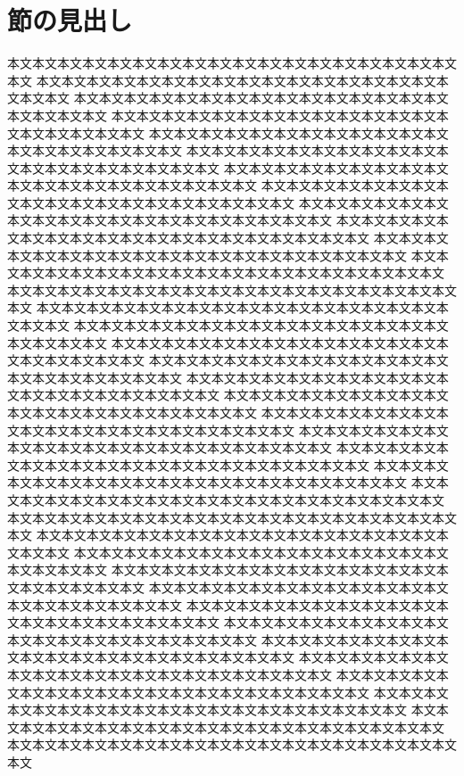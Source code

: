 \documentclass{mta}
\begin{document}
\section{節の見出し}
本文本文本文本文本文本文本文本文本文本文本文本文本文本文本文本文本文本文本文
本文本文本文本文本文本文本文本文本文本文本文本文本文本文本文本文本文本文本文
本文本文本文本文本文本文本文本文本文本文本文本文本文本文本文本文本文本文本文
本文本文本文本文本文本文本文本文本文本文本文本文本文本文本文本文本文本文本文
本文本文本文本文本文本文本文本文本文本文本文本文本文本文本文本文本文本文本文
本文本文本文本文本文本文本文本文本文本文本文本文本文本文本文本文本文本文本文
本文本文本文本文本文本文本文本文本文本文本文本文本文本文本文本文本文本文本文
本文本文本文本文本文本文本文本文本文本文本文本文本文本文本文本文本文本文本文
本文本文本文本文本文本文本文本文本文本文本文本文本文本文本文本文本文本文本文
本文本文本文本文本文本文本文本文本文本文本文本文本文本文本文本文本文本文本文
本文本文本文本文本文本文本文本文本文本文本文本文本文本文本文本文本文本文本文
本文本文本文本文本文本文本文本文本文本文本文本文本文本文本文本文本文本文本文
本文本文本文本文本文本文本文本文本文本文本文本文本文本文本文本文本文本文本文
本文本文本文本文本文本文本文本文本文本文本文本文本文本文本文本文本文本文本文
本文本文本文本文本文本文本文本文本文本文本文本文本文本文本文本文本文本文本文
本文本文本文本文本文本文本文本文本文本文本文本文本文本文本文本文本文本文本文
本文本文本文本文本文本文本文本文本文本文本文本文本文本文本文本文本文本文本文
本文本文本文本文本文本文本文本文本文本文本文本文本文本文本文本文本文本文本文
本文本文本文本文本文本文本文本文本文本文本文本文本文本文本文本文本文本文本文
本文本文本文本文本文本文本文本文本文本文本文本文本文本文本文本文本文本文本文
本文本文本文本文本文本文本文本文本文本文本文本文本文本文本文本文本文本文本文
本文本文本文本文本文本文本文本文本文本文本文本文本文本文本文本文本文本文本文
本文本文本文本文本文本文本文本文本文本文本文本文本文本文本文本文本文本文本文
本文本文本文本文本文本文本文本文本文本文本文本文本文本文本文本文本文本文本文
本文本文本文本文本文本文本文本文本文本文本文本文本文本文本文本文本文本文本文
本文本文本文本文本文本文本文本文本文本文本文本文本文本文本文本文本文本文本文
本文本文本文本文本文本文本文本文本文本文本文本文本文本文本文本文本文本文本文
本文本文本文本文本文本文本文本文本文本文本文本文本文本文本文本文本文本文本文
本文本文本文本文本文本文本文本文本文本文本文本文本文本文本文本文本文本文本文
本文本文本文本文本文本文本文本文本文本文本文本文本文本文本文本文本文本文本文
本文本文本文本文本文本文本文本文本文本文本文本文本文本文本文本文本文本文本文
本文本文本文本文本文本文本文本文本文本文本文本文本文本文本文本文本文本文本文
本文本文本文本文本文本文本文本文本文本文本文本文本文本文本文本文本文本文本文
本文本文本文本文本文本文本文本文本文本文本文本文本文本文本文本文本文本文本文
本文本文本文本文本文本文本文本文本文本文本文本文本文本文本文本文本文本文本文
本文本文本文本文本文本文本文本文本文本文本文本文本文本文本文本文本文本文本文
本文本文本文本文本文本文本文本文本文本文本文本文本文本文本文本文本文本文本文
\end{document}
